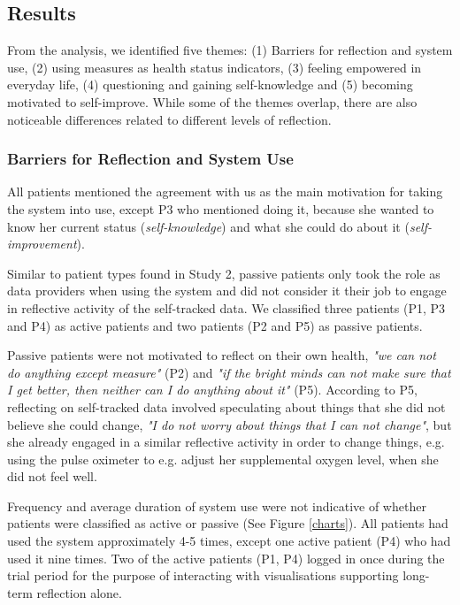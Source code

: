 \subsection{Results}
From the analysis, we identified five themes: (1) Barriers for reflection and system use, (2) using measures as health status indicators, (3) feeling empowered in everyday life, (4) questioning and gaining self-knowledge and (5) becoming motivated to self-improve. While some of the themes overlap, there are also noticeable differences related to different levels of reflection. 

\subsubsection{Barriers for Reflection and System Use}
All patients mentioned the agreement with us as the main motivation for taking the system into use, except P3 who mentioned doing it, because she wanted to know her current status (\textit{self-knowledge}) and what she could do about it (\textit{self-improvement}). 

Similar to patient types found in Study 2, passive patients only took the role as data providers when using the system and did not consider it their job to engage in reflective activity of the self-tracked data. We classified three patients (P1, P3 and P4) as active patients and two patients (P2 and P5) as passive patients. 

Passive patients were not motivated to reflect on their own health, \textit{"we can not do anything except measure"} (P2) and \textit{"if the bright minds can not make sure that I get better, then neither can I do anything about it"} (P5). According to P5, reflecting on self-tracked data involved speculating about things that she did not believe she could change, \textit{"I do not worry about things that I can not change"}, but she already engaged in a similar reflective activity in order to change things, e.g. using the pulse oximeter to e.g. adjust her supplemental oxygen level, when she did not feel well.

Frequency and average duration of system use were not indicative of whether patients were classified as active or passive (See Figure \ref{charts}). All patients had used the system approximately 4-5 times, except one active patient (P4) who had used it nine times. Two of the active patients (P1, P4) logged in once during the trial period for the purpose of interacting with visualisations supporting long-term reflection alone. 


